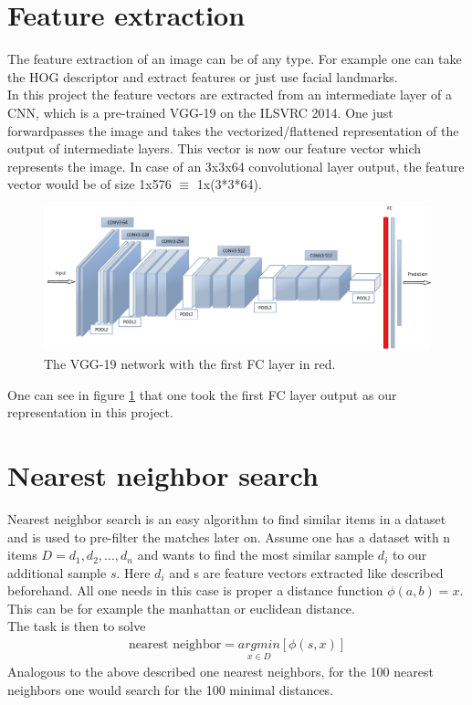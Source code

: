 \documentclass[
     11pt,         %
     a4paper,      %
     oneside,
     ]{article}
\begin{document}
\section{Feature extraction}
The feature extraction of an image can be of any type. For example one can take the HOG descriptor and extract features or just use facial landmarks.\\
In this project the feature vectors are extracted from an intermediate layer of a CNN, which is a pre-trained VGG-19 on the ILSVRC 2014.
One just forwardpasses the image and takes the vectorized/flattened representation of the output of intermediate layers.
This vector is now our feature vector which represents the image. In case of an 3x3x64 convolutional layer output, the feature vector would be of size 1x576 $\equiv$ 1x(3*3*64).\\
\begin{figure}[H]
  \begin{center}
    \includegraphics[width=1.0\textwidth]{images/VGG19.png}
    \caption{The VGG-19 network with the first FC layer in red.}
    \label{fig:VGG19}
  \end{center}
\end{figure}
One can see in figure \ref{fig:VGG19} that one took the first FC layer output as our representation in this project.


\section{Nearest neighbor search}
Nearest neighbor search is an easy algorithm to find similar items in a dataset and is used to pre-filter the matches later on. Assume one has a dataset with n items $D = {d_1, d_2, ..., d_n}$ and wants to find the most similar sample $d_i$ to our additional sample $s$. Here $d_i$ and s are feature vectors extracted like described beforehand. All one needs in this case is proper a distance function $\phi(a,b) = x$. This can be for example the manhattan or euclidean distance. \\
The task is then to solve
\begin{align*}
  \text{nearest neighbor} = \underset{x \in D}{argmin} [\phi(s,x)]
\end{align*}
Analogous to the above described one nearest neighbors, for the 100 nearest neighbors one would search for the 100 minimal distances.
\end{document}
